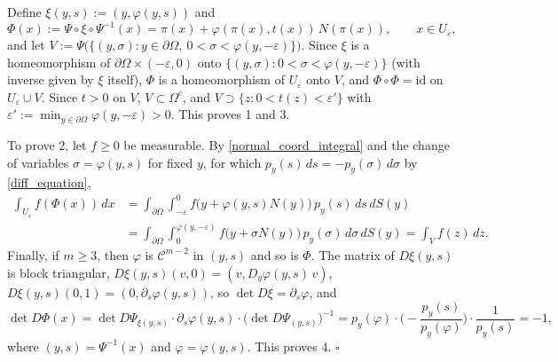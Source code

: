 \documentclass[a4paper,12pt]{amsart}
\newcommand{\eproof}{\hfill \mbox{${\square}$}}
\begin{document}
{Define $\xi(y,s) := (y, \varphi(y,s))$ and
  \begin{equation*}
   \Phi(x) := \Psi\circ\xi\circ\Psi^{-1}(x) = \pi(x) + \varphi( \pi(x), t(x))\, N(\pi(x)), \qquad x \in U_\varepsilon,
  \end{equation*}
and let $V := \Psi\big(\{(y,\sigma) : y \in\partial\Omega,\ 0 < \sigma < \varphi(y,-\varepsilon)\}\big)$.
Since $\xi$ is a homeomorphism of $\partial\Omega\times(-\varepsilon,0)$ onto $\{(y,\sigma): 0<\sigma<\varphi(y,-\varepsilon)\}$ (with inverse given by $\xi$ itself), $\Phi$ is a homeomorphism of $U_\varepsilon$ onto $V$, and $\Phi\circ\Phi = \mathrm{id}$ on $U_\varepsilon\cup V$. Since $t > 0$ on $V$, $V \subset \Omega^c$, and $V \supset \{z : 0 < t(z) < \varepsilon'\}$ with $\varepsilon' := \min_{y\in\partial\Omega} \varphi(y,-\varepsilon) > 0$. This proves 1 and 3.}

{To prove 2, let $f \geq 0$ be measurable. By \eqref{normal_coord_integral} and the change of variables $\sigma = \varphi(y,s)$ for fixed $y$, for which $p_y(s)\,ds = -p_y(\sigma)\,d\sigma$ by \eqref{diff_equation},
\begin{align*}
\int_{U_\varepsilon} f(\Phi(x))\, dx
 & = \int_{\partial\Omega}\int_{-\varepsilon}^{0} f\big(y + \varphi(y,s)N(y)\big)\, p_y(s)\, ds\, dS(y) \\
 & = \int_{\partial\Omega}\int_{0}^{\varphi(y,-\varepsilon)} f\big(y + \sigma N(y)\big)\, p_y(\sigma)\, d\sigma\, dS(y)
 = \int_V f(z)\, dz .
\end{align*}
Finally, if $m \geq 3$, then $\varphi$ is $\mathcal{C}^{m-2}$ in $(y,s)$ and so is $\Phi$. The matrix of $D\xi(y,s)$ is block triangular,
$D\xi(y,s)(v,0) = (v, D_y\varphi(y,s)\,v)$, $D\xi(y,s)(0,1) = (0, \partial_s\varphi(y,s))$, so $\det D\xi = \partial_s\varphi$, and
\[
 \det D\Phi(x) = \det D\Psi_{\xi(y,s)}\cdot \partial_s\varphi(y,s)\cdot \big(\det D\Psi_{(y,s)}\big)^{-1}
 = p_y(\varphi)\cdot\Big(-\frac{p_y(s)}{p_y(\varphi)}\Big)\cdot \frac{1}{p_y(s)} = -1,
\]
where $(y,s) = \Psi^{-1}(x)$ and $\varphi = \varphi(y,s)$. This proves 4.}
  \eproof
\end{document}
